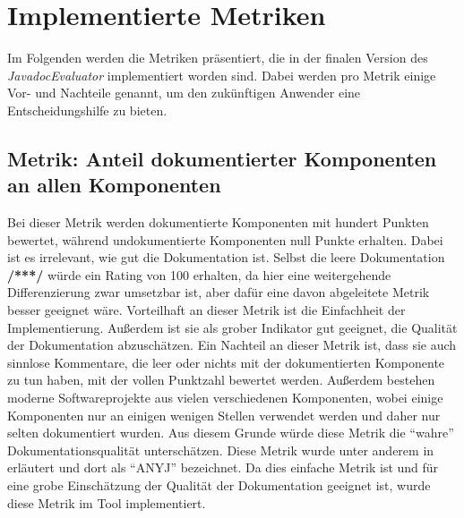 \section{Implementierte Metriken}\label{chapter:metrics}
Im Folgenden werden die Metriken präsentiert, die in der finalen Version des \textit{JavadocEvaluator} implementiert worden sind. Dabei werden pro Metrik einige Vor- und Nachteile genannt, um den zukünftigen Anwender eine Entscheidungshilfe zu bieten. 
\subsection{Metrik: Anteil dokumentierter Komponenten an allen Komponenten}\label{chapter:metrics_simple_comment}
Bei dieser Metrik werden dokumentierte Komponenten mit hundert Punkten bewertet, während undokumentierte Komponenten null Punkte erhalten. Dabei ist es irrelevant, wie gut die Dokumentation ist. Selbst die leere Dokumentation \textbf{/***/} würde ein Rating von 100 erhalten, da hier eine weitergehende Differenzierung zwar umsetzbar ist, aber dafür eine davon abgeleitete Metrik besser geeignet wäre. Vorteilhaft an dieser Metrik ist die Einfachheit der Implementierung. Außerdem ist sie als grober Indikator gut geeignet, die Qualität der Dokumentation abzuschätzen. Ein Nachteil an dieser Metrik ist, dass sie auch sinnlose Kommentare, die leer oder nichts mit der dokumentierten Komponente zu tun haben, mit der vollen Punktzahl bewertet werden. Außerdem bestehen moderne Softwareprojekte aus vielen verschiedenen Komponenten, wobei einige Komponenten nur an einigen wenigen Stellen verwendet werden und daher nur selten dokumentiert wurden. Aus diesem Grunde würde diese Metrik die \enquote{wahre} Dokumentationsqualität unterschätzen. 
Diese Metrik wurde unter anderem in \cite[S. 5]{HowDocumentationEvolvesoverTime} erläutert und dort als \enquote{ANYJ} bezeichnet. Da dies einfache Metrik ist und für eine grobe Einschätzung der Qualität der Dokumentation geeignet ist, wurde diese Metrik im Tool implementiert.

